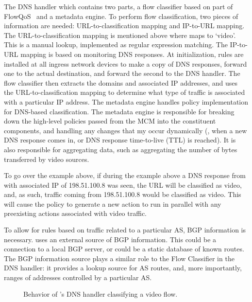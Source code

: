 The DNS handler which contains two parts, a flow classifier based on part of FlowQoS~\cite{FlowQoS} and a metadata engine. To perform flow classification, two pieces of information are needed: URL-to-classification mapping and IP-to-URL mapping. The URL-to-classification mapping is mentioned above where  maps to `video'. This is a manual lookup, implemented as regular expression matching. The IP-to-URL mapping is based on monitoring DNS responses. At initialization, rules are installed at all ingress network devices to make a copy of DNS responses, forward one to the actual destination, and forward the second to the DNS handler. The flow classifier then extracts the domains and associated IP addresses, and uses the URL-to-classification mapping to determine what type of traffic is associated with a particular IP address. 
The metadata engine handles policy implementation for DNS-based classification. The metadata engine is responsible for breaking down the high-level policies passed from the MCM into the constituent components, and handling any changes that my occur dynamically (\ie{}, when a new DNS response comes in, or DNS response time-to-live (TTL) is reached). It is also responsible for aggregating data, such as aggregating the number of bytes transferred by video sources.

To go over the example above, if during the example above a DNS response from  with associated IP of 198.51.100.8 was seen, the URL will be classified as video, and, as such, traffic coming from 198.51.100.8 would be classified as video. This will cause the  policy to generate a new  action to run in parallel with any preexisting actions associated with video traffic. 

To allow for rules based on traffic related to a particular AS, BGP information is necessary. \system{} uses an external source of BGP information. This could be a connection to a local BGP server, or could be a static database of known routes. The BGP information source plays a similar role to the Flow Classifier in the DNS handler: it provides a lookup source for AS routes, and, more importantly, ranges of addresses controlled by a particular AS.



\begin{figure}
    \centering
    \caption{Behavior of \system{}'s DNS handler classifying a video flow.}
    \label{fig:flow}
\end{figure}


